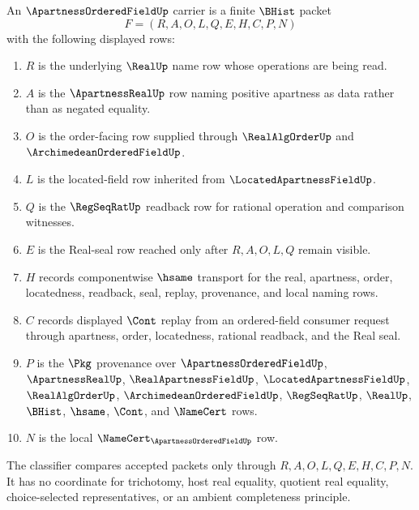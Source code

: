 \begin{definition}
\label{def:apartness-ordered-field-carrier}
An $\ApartnessOrderedFieldUp$ carrier is a finite $\BHist$ packet
$$
F=(R,A,O,L,Q,E,H,C,P,N)
$$
with the following displayed rows:
\begin{enumerate}
\item $R$ is the underlying $\RealUp$ name row whose operations are being read.
\item $A$ is the $\ApartnessRealUp$ row naming positive apartness as data rather than as negated equality.
\item $O$ is the order-facing row supplied through $\RealAlgOrderUp$ and $\ArchimedeanOrderedFieldUp$.
\item $L$ is the located-field row inherited from $\LocatedApartnessFieldUp$.
\item $Q$ is the $\RegSeqRatUp$ readback row for rational operation and comparison witnesses.
\item $E$ is the Real-seal row reached only after $R,A,O,L,Q$ remain visible.
\item $H$ records componentwise $\hsame$ transport for the real, apartness, order, locatedness, readback, seal, replay, provenance, and local naming rows.
\item $C$ records displayed $\Cont$ replay from an ordered-field consumer request through apartness, order, locatedness, rational readback, and the Real seal.
\item $P$ is the $\Pkg$ provenance over $\ApartnessOrderedFieldUp$, $\ApartnessRealUp$, $\RealApartnessFieldUp$, $\LocatedApartnessFieldUp$, $\RealAlgOrderUp$, $\ArchimedeanOrderedFieldUp$, $\RegSeqRatUp$, $\RealUp$, $\BHist$, $\hsame$, $\Cont$, and $\NameCert$ rows.
\item $N$ is the local $\NameCert_{\ApartnessOrderedFieldUp}$ row.
\end{enumerate}
The classifier compares accepted packets only through $R,A,O,L,Q,E,H,C,P,N$. It has no coordinate for trichotomy, host real equality, quotient real equality, choice-selected representatives, or an ambient completeness principle.
\end{definition}

